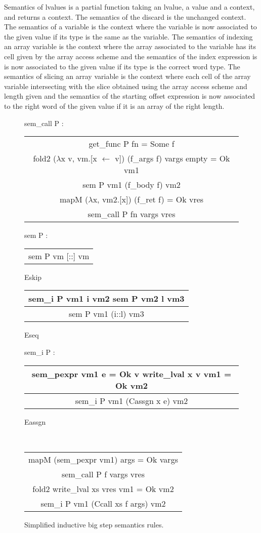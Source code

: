 \documentclass{article}
\begin{document}

Semantics of lvalues is a partial function taking an lvalue, a value
and a context, and returns a context.
The semantics of the discard is the unchanged context. The semantics of a variable
is the context where the variable is now associated to the given value if its
type is the same as the variable. The semantics of indexing an array variable is
the context where the array associated to the variable has
its cell given by the array access scheme and the semantics of the index
expression is is now associated to
the given value if its type is the correct word type. The semantics of slicing an
array variable is the context where each cell of the array variable intersecting
with the slice obtained using the array access scheme
and length given and the semantics of the starting offset expression is now
associated to the right
word of the given value if it is an array of the right length.

\medskip

\begin{figure}[t]
\ttfamily
sem\_call P :
\begin{center}
\begin{tabular}{c}
get\_func P fn = Some f \\
fold2 (\(\lambda\)x v, vm.[x \(\leftarrow\) v]) (f\_args f) vargs empty = Ok vm1 \\
sem P vm1 (f\_body f) vm2 \\
mapM (\(\lambda\)x, vm2.[x]) (f\_ret f) = Ok vres
\\\hline
sem\_call P fn vargs vres
\end{tabular}
\end{center}

sem P :
\begin{center}
\begin{tabular}{c}
\\\hline
sem P vm [::] vm
\end{tabular} Eskip\quad
\begin{tabular}{c}
sem\_i P vm1 i vm2\quad
sem P vm2 l vm3
\\\hline
sem P vm1 (i::l) vm3
\end{tabular} Eseq
\end{center}

sem\_i P :
\begin{center}
\begin{tabular}{c}
sem\_pexpr vm1 e = Ok v\quad
write\_lval x v vm1 = Ok vm2
\\\hline
sem\_i P vm1 (Cassgn x e) vm2
\end{tabular} Eassgn

~

\begin{tabular}{c}
mapM (sem\_pexpr vm1) args = Ok vargs \\
sem\_call P f vargs vres \\
fold2 write\_lval xs vres vm1 = Ok vm2
\\\hline
sem\_i P vm1 (Ccall xs f args) vm2
\end{tabular} \raisebox{-\baselineskip}{Ecall}
\end{center}
\normalfont%
\caption{Simplified inductive big step semantics rules.}
\end{figure}
\end{document}
